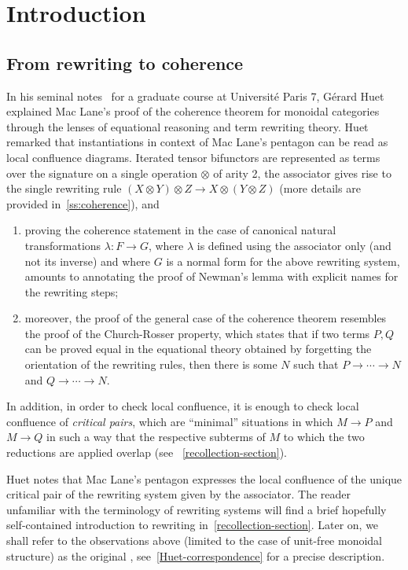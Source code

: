
\section*{Introduction} 
\label{s:introduction}



\subsection*{From rewriting to coherence}
In his seminal notes~\cite{Huet-notes-cat} for a graduate course at Université Paris 7, Gérard Huet explained Mac Lane's proof of the coherence theorem for monoidal categories through the lenses of equational reasoning and  term rewriting theory. 
Huet remarked that instantiations in context of Mac Lane's pentagon can be read as local confluence diagrams. Iterated tensor bifunctors  are represented as terms over the signature on a single operation $\otimes$ of arity 2, the associator gives rise to the single rewriting rule $(X\otimes Y)\otimes Z\to X\otimes(Y\otimes Z)$ (more details are provided in~\cref{ss:coherence}), and
\begin{enumerate}
\item proving  the coherence statement in the case of canonical natural transformations $\lambda:F\rightarrow G$, where $\lambda$ is defined using the associator only (and not its inverse) and where $G$ is a normal form for the above rewriting system, amounts to annotating the proof of Newman's lemma with  explicit names for the rewriting steps;
\item moreover, the proof of the general case of the coherence theorem resembles the proof of the Church-Rosser property, which states that if two terms $P,Q$ can be proved equal in the equational theory obtained by forgetting the orientation of the rewriting rules, then there is some $N$ such that $P\rightarrow\cdots\rightarrow N$ and
$Q\rightarrow\cdots\rightarrow N$.
\end{enumerate}
In addition, in order to check local confluence, it is enough to check local confluence of {\em critical pairs}, which are ``minimal'' situations in which $M\rightarrow P$ and $M\rightarrow Q$ in such a way that the respective subterms of $M$ to which the two reductions are applied overlap (see ~\cref{recollection-section}).

Huet notes that Mac Lane's pentagon expresses the local confluence of the unique critical pair of  the rewriting system given by the associator. The reader unfamiliar with the terminology of rewriting systems will find a brief hopefully self-contained introduction to rewriting in~\cref{recollection-section}.
Later on, we shall refer to the observations above (limited to the case of unit-free monoidal structure) as the original , see~\cref{Huet-correspondence} for a precise description.
 
